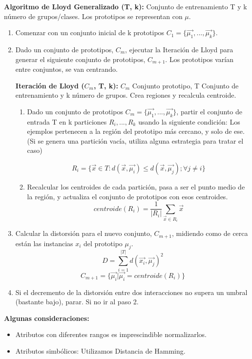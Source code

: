 \documentclass[12pt, twoside, openright]{report} %
\begin{document}
\textbf{Algoritmo de Lloyd Generalizado (T, k):} Conjunto de entrenamiento T y k número de grupos/clases. Los prototipos se representan con $\mu$.

\begin{enumerate}
	\item Comenzar con un conjunto inicial de k prototipos $C_1 = \{\vec{\mu_1}, ..., \vec{\mu_k} \}$.
	\item Dado un conjunto de prototipos, $C_m$, ejecutar la Iteración de Lloyd para generar el siguiente conjunto de prototipos, $C_{m+1}$. Los prototipos varían entre conjuntos, se van centrando.

	      \textbf{Iteración de Lloyd ($C_m$, T, k):} $C_m$ Conjunto prototipo, T Conjunto de entrenamiento y k número de grupos. Crea regiones y recalcula centroide.
	      \begin{enumerate}
		      \item Dado un conjunto de prototipos $C_m = \{\vec{\mu_1}, ..., \vec{\mu_k} \}$, partir el conjunto de entrada T en k particiones $R_i, ..., R_k$ usando la siguiente condición: Los ejemplos pertenecen a la región del prototipo más cercano, y solo de ese. (Si se genera una partición vacía, utiliza alguna estrategia para tratar el caso)

		            $$R_i = \{ \vec{x} \in T: d(\vec{x}, \vec{\mu_i}) \leq d(\vec{x}, \vec{\mu_j}); \forall j \neq i \}$$
		      \item Recalcular los centroides de cada partición, pasa a ser el punto medio de la región, y actualiza el conjunto de prototipos con esos centroides.
		            $$centroide(R_i) = \frac{1}{|R_i|} \sum_{\vec{x} \in R_i} \vec{x}$$
	      \end{enumerate}
	\item Calcular la distorsión para el nuevo conjunto, $C_{m+1}$, midiendo como de cerca están las instancias $x_i$ del prototipo $\mu_j$.
	      $$D = \sum^{|T|}_{i=1} d( \vec{x_i}, \vec{\mu_j})^2$$
	      $$C_{m+1} = \{\vec{\mu_i}|\vec{\mu_i} = centroide(R_i) \}$$
	\item Si el decremento de la distorsión entre dos interacciones no supera un umbral (bastante bajo), parar. Si no ir al paso 2.
\end{enumerate}

\textbf{Algunas consideraciones:}
\begin{itemize}
	\item Atributos con diferentes rangos es imprescindible normalizarlos.
	\item Atributos simbólicos: Utilizamos Distancia de Hamming.
\end{itemize}
\end{document}
